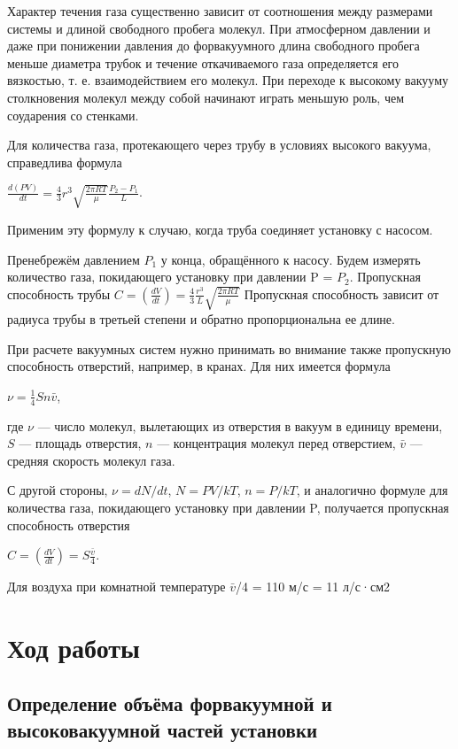\documentclass[a4paper]{article}
\begin{document}
Характер течения газа существенно зависит от соотношения между размерами системы и длиной свободного пробега молекул. При атмосферном давлении
и даже при понижении давления до форвакуумного длина свободного пробега меньше диаметра трубок и течение откачиваемого газа определяется его вязкостью, т. е. взаимодействием его молекул. При переходе к высокому
вакууму столкновения молекул между собой начинают играть меньшую роль, чем соударения со стенками. \par
Для количества газа, протекающего через трубу в условиях высокого вакуума, справедлива формула
\begin{center}
$\frac{d(PV)}{dt} = \frac{4}{3}r^3 \sqrt{\frac{2\pi RT}{\mu}}\frac{P_2-P_1}{L}$.
\end{center}
Применим эту формулу к случаю, когда труба соединяет установку с насосом. \par
Пренебрежём давлением $P_1$ у конца, обращённого к насосу. Будем измерять количество газа, покидающего установку при давлении P = $P_2$. Пропускная способность трубы
$C = (\frac{dV}{dt}) = \frac{4}{3}\frac{r^3}{L}\sqrt{\frac{2\pi RT}{\mu}}$
Пропускная способность зависит от радиуса трубы в
третьей степени и обратно пропорциональна ее длине. \par
При расчете вакуумных систем нужно принимать во внимание также пропускную способность отверстий, например, в кранах. Для них имеется формула
\begin{center}
$\nu = \frac{1}{4}Sn\bar v$,
\end{center}
где $\nu$ — число молекул, вылетающих из отверстия в вакуум в единицу
времени, $S$ — площадь отверстия, $n$ — концентрация молекул перед отверстием, $\bar v$ — средняя скорость молекул газа. \par
С другой стороны, $\nu = dN/dt$, $N = PV/kT$, $n=P/kT$, и аналогично формуле для количества газа, покидающего установку при давлении P, получается пропускная способность отверстия
\begin{center}
$C = (\frac{dV}{dt})=S\frac{\bar v}{4}$.
\end{center}
Для воздуха при комнатной температуре $\bar v$/4 = 110 м/с = 11 л/с·см2

\section{Ход работы}

\subsection{Определение объёма форвакуумной и высоковакуумной частей установки}
\end{document}
